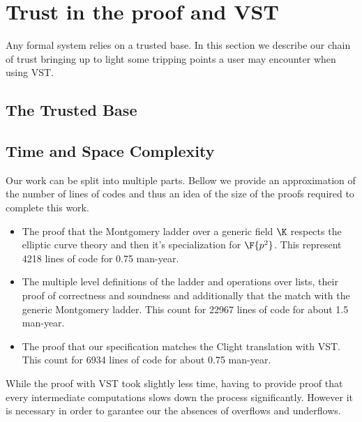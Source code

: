 \section{Trust in the proof and VST}
\label{sec5-vst}

Any formal system relies on a trusted base. In this section we describe our
chain of trust bringing up to light some tripping points a user may encounter
when using VST.

\subsection{The Trusted Base}




\subsection{Time and Space Complexity}

Our work can be split into multiple parts. Bellow we provide an approximation of
the number of lines of codes and thus an idea of the size of the proofs required to
complete this work.
\begin{itemize}
  \item The proof that the Montgomery ladder over a generic field $\K$ respects
  the elliptic curve theory and then it's specialization for $\F{p^2}$.
  This represent 4218 lines of code for 0.75 man-year.
  \item The multiple level definitions of the ladder and operations over lists,
  their proof of correctness and soundness and additionally that the match with
  the generic Montgomery ladder. This count for 22967 lines of code for about 1.5 man-year.
  \item The proof that our specification matches the Clight translation with VST.
  This count for 6934 lines of code for about 0.75 man-year.
\end{itemize}
While the proof with VST took slightly less time, having to provide proof that every
intermediate computations slows down the process significantly. However it is
necessary in order to garantee our the absences of overflows and underflows.
